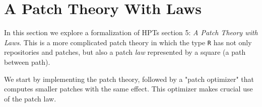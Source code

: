 \section{A Patch Theory With Laws}\label{sec/laws-noTrunc-noIndep}

In this section we explore a formalization of HPTs section 5: \emph{A Patch Theory with Laws}.
This is a more complicated patch theory in which the type \texttt{R} has not only repositories
and patches, but also a patch \emph{law} represented by a square (a path between path).

We start by implementing the patch theory, followed by a "patch optimizer" that computes
smaller patches with the same effect. This optimizer makes crucial use of the patch law.

\begin{code}[hide]%
\>[0]\AgdaSymbol{\{-\#}\AgdaSpace{}%
\AgdaSpace{}%
\AgdaSpace{}%
\AgdaSymbol{\#-\}}\<%
\\
%
\\[\AgdaEmptyExtraSkip]%
\>[0]\AgdaSpace{}%
\AgdaSpace{}%
\<%
\\
%
\\[\AgdaEmptyExtraSkip]%
\>[0]\AgdaSpace{}%
\AgdaSpace{}%
\AgdaSpace{}%
\<%
\\
\>[0][@{}l@{\AgdaIndent{0}}]%
\>[2]\AgdaSymbol{(}%
\>[13]\AgdaSymbol{;}\AgdaSpace{}%
\AgdaOperator{\AgdaFunction{\#\AgdaUnderscore{}}}\AgdaSpace{}%
\AgdaSymbol{;}\AgdaSpace{}%
\AgdaSpace{}%
\AgdaSymbol{;}\AgdaSpace{}%
\AgdaSymbol{)}\<%
\\
\>[0]\AgdaSpace{}%
\AgdaSpace{}%
\<%
\\
\>[0][@{}l@{\AgdaIndent{0}}]%
\>[2]\AgdaSymbol{(}\AgdaSpace{}%
\AgdaSymbol{;}\AgdaSpace{}%
\AgdaSpace{}%
\AgdaSymbol{;}\AgdaSpace{}%
\AgdaOperator{\AgdaFunction{\AgdaUnderscore{}==\AgdaUnderscore{}}}\AgdaSymbol{)}\<%
\\
\>[0]\AgdaSpace{}%
\AgdaSpace{}%
\AgdaSpace{}%
\<%
\\
\>[0][@{}l@{\AgdaIndent{0}}]%
\>[2]\AgdaSymbol{(}\AgdaSpace{}%

\end{code}
